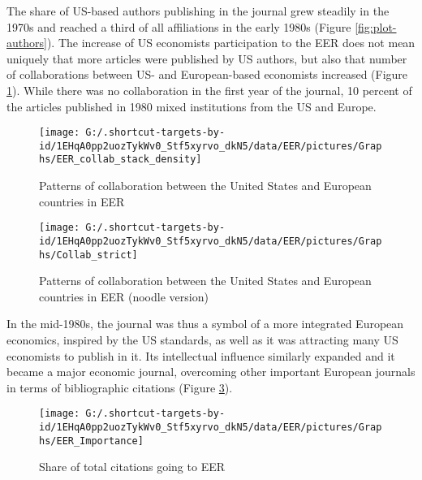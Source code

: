 \documentclass[]{elsarticle} %
\begin{document}
The share of US-based authors publishing in the journal grew steadily in
the 1970s and reached a third of all affiliations in the early 1980s
(Figure \ref{fig:plot-authors}). The increase of US economists
participation to the EER does not mean uniquely that more articles were
published by US authors, but also that number of collaborations between
US- and European-based economists increased (Figure
\ref{fig:plot-collabs}). While there was no collaboration in the first
year of the journal, 10 percent of the articles published in 1980 mixed
institutions from the US and Europe.

\begin{figure}[h]

{\centering \texttt{[image: G:/.shortcut-targets-by-id/1EHqA0pp2uozTykWv0\_Stf5xyrvo\_dkN5/data/EER/pictures/Graphs/EER\_collab\_stack\_density]} 

}

\caption{Patterns of collaboration between the United States and European countries in EER}\label{fig:plot-collabs}
\end{figure}

\begin{figure}[h]

{\centering \texttt{[image: G:/.shortcut-targets-by-id/1EHqA0pp2uozTykWv0\_Stf5xyrvo\_dkN5/data/EER/pictures/Graphs/Collab\_strict]} 

}

\caption{Patterns of collaboration between the United States and European countries in EER (noodle version)}\label{fig:plot-collabs2}
\end{figure}

In the mid-1980s, the journal was thus a symbol of a more integrated
European economics, inspired by the US standards, as well as it was
attracting many US economists to publish in it. Its intellectual
influence similarly expanded and it became a major economic journal,
overcoming other important European journals in terms of bibliographic
citations (Figure \ref{fig:plot-eer-importance}).

\begin{figure}[h]

{\centering \texttt{[image: G:/.shortcut-targets-by-id/1EHqA0pp2uozTykWv0\_Stf5xyrvo\_dkN5/data/EER/pictures/Graphs/EER\_Importance]} 

}

\caption{Share of total citations going to EER}\label{fig:plot-eer-importance}
\end{figure}
\end{document}
